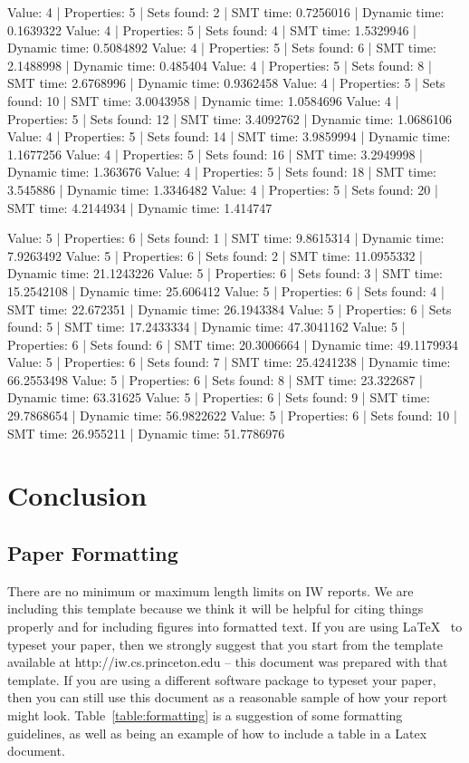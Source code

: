 \documentclass[pageno]{jpaper}
\begin{document}
Value: 4 | Properties: 5 | Sets found: 2 | SMT time: 0.7256016 | Dynamic time: 0.1639322
Value: 4 | Properties: 5 | Sets found: 4 | SMT time: 1.5329946 | Dynamic time: 0.5084892
Value: 4 | Properties: 5 | Sets found: 6 | SMT time: 2.1488998 | Dynamic time: 0.485404
Value: 4 | Properties: 5 | Sets found: 8 | SMT time: 2.6768996 | Dynamic time: 0.9362458
Value: 4 | Properties: 5 | Sets found: 10 | SMT time: 3.0043958 | Dynamic time: 1.0584696
Value: 4 | Properties: 5 | Sets found: 12 | SMT time: 3.4092762 | Dynamic time: 1.0686106
Value: 4 | Properties: 5 | Sets found: 14 | SMT time: 3.9859994 | Dynamic time: 1.1677256
Value: 4 | Properties: 5 | Sets found: 16 | SMT time: 3.2949998 | Dynamic time: 1.363676
Value: 4 | Properties: 5 | Sets found: 18 | SMT time: 3.545886 | Dynamic time: 1.3346482
Value: 4 | Properties: 5 | Sets found: 20 | SMT time: 4.2144934 | Dynamic time: 1.414747


Value: 5 | Properties: 6 | Sets found: 1 | SMT time: 9.8615314 | Dynamic time: 7.9263492
Value: 5 | Properties: 6 | Sets found: 2 | SMT time: 11.0955332 | Dynamic time: 21.1243226
Value: 5 | Properties: 6 | Sets found: 3 | SMT time: 15.2542108 | Dynamic time: 25.606412
Value: 5 | Properties: 6 | Sets found: 4 | SMT time: 22.672351 | Dynamic time: 26.1943384
Value: 5 | Properties: 6 | Sets found: 5 | SMT time: 17.2433334 | Dynamic time: 47.3041162
Value: 5 | Properties: 6 | Sets found: 6 | SMT time: 20.3006664 | Dynamic time: 49.1179934
Value: 5 | Properties: 6 | Sets found: 7 | SMT time: 25.4241238 | Dynamic time: 66.2553498
Value: 5 | Properties: 6 | Sets found: 8 | SMT time: 23.322687 | Dynamic time: 63.31625
Value: 5 | Properties: 6 | Sets found: 9 | SMT time: 29.7868654 | Dynamic time: 56.9822622
Value: 5 | Properties: 6 | Sets found: 10 | SMT time: 26.955211 | Dynamic time: 51.7786976

\section{Conclusion}










\subsection{Paper Formatting}
\label{section:formatting}

There are no minimum or maximum length limits on IW reports.  
We are including this template because we think it will be helpful
for citing things properly and for including figures into formatted
text.  If you are using \LaTeX~\cite{lamport94} 
to typeset your paper, then we strongly suggest
that you start from the template available at
http://iw.cs.princeton.edu -- this
document was prepared with that template.  
If you are using a different software package to typeset your paper, 
then you can still use this document as a reasonable sample of 
how your report might look.  Table~\ref{table:formatting} is a suggestion
of some formatting guidelines, as well as being an example of how to
include a table in a Latex document.
\end{document}
